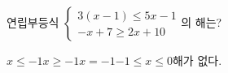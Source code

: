연립부등식 $\begin{cases} 3(x-1)\le 5x-1 \\ -x+7\ge 2x+10 \end{cases}$의 해는?
\begin{choices32}{$x\le -1$}{$x\ge -1$}{$x=-1$}{$-1\le x\le 0$}{해가 없다.}\end{choices32}
